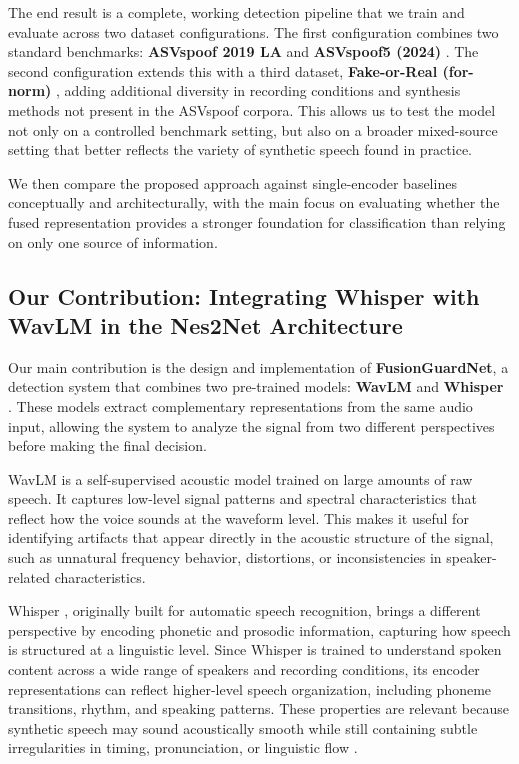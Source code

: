 \documentclass[11pt,a4paper]{article}
\begin{document}
The end result is a complete, working detection pipeline that we train and evaluate
across two dataset configurations. The first configuration combines two standard
benchmarks: \textbf{ASVspoof 2019 LA} \cite{kinnunen2019asvspoof} and
\textbf{ASVspoof5 (2024)} \cite{wang2024asvspoof5}. The second configuration
extends this with a third dataset, \textbf{Fake-or-Real (for-norm)}
\cite{abdeldayem2024fakeorreal}, adding additional diversity in recording
conditions and synthesis methods not present in the ASVspoof corpora. This allows
us to test the model not only on a controlled benchmark setting, but also on a
broader mixed-source setting that better reflects the variety of synthetic speech
found in practice.

We then compare the proposed approach against single-encoder baselines
conceptually and architecturally, with the main focus on evaluating whether the
fused representation provides a stronger foundation for classification than relying
on only one source of information.

\subsection{Our Contribution: Integrating Whisper with WavLM in the Nes2Net Architecture}

Our main contribution is the design and implementation of \textbf{FusionGuardNet},
a detection system that combines two pre-trained models: \textbf{WavLM}
\cite{chen2022wavlm} and \textbf{Whisper} \cite{radford2023whisper}. These models
extract complementary representations from the same audio input, allowing the
system to analyze the signal from two different perspectives before making the
final decision.

WavLM \cite{chen2022wavlm} is a self-supervised acoustic model trained on large
amounts of raw speech. It captures low-level signal patterns and spectral
characteristics that reflect how the voice sounds at the waveform level. This
makes it useful for identifying artifacts that appear directly in the acoustic
structure of the signal, such as unnatural frequency behavior, distortions, or
inconsistencies in speaker-related characteristics.

Whisper \cite{radford2023whisper}, originally built for automatic speech
recognition, brings a different perspective by encoding phonetic and prosodic
information, capturing how speech is structured at a linguistic level. Since
Whisper is trained to understand spoken content across a wide range of speakers
and recording conditions, its encoder representations can reflect higher-level
speech organization, including phoneme transitions, rhythm, and speaking patterns.
These properties are relevant because synthetic speech may sound acoustically
smooth while still containing subtle irregularities in timing, pronunciation, or
linguistic flow \cite{nguyen2025linguistic,zhu2024slim}.
\end{document}
